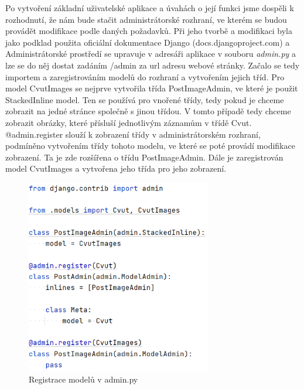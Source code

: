 Po vytvoření základní uživatelské aplikace a úvahách o její funkci jsme dospěli k rozhodnutí, že nám bude stačit administrátorské rozhraní, ve kterém se budou provádět modifikace podle daných požadavků.
Při jeho tvorbě a modifikaci byla jako podklad použita oficiální dokumentace Django (docs.djangoproject.com) a \cite{django-admin-book} Administrátorské prostředí se upravuje v adresáři aplikace v souboru \emph{admin.py} a lze se do něj dostat zadáním /admin za url adresu webové stránky. Začalo se tedy importem a zaregistrováním modelů do rozhraní a vytvořením jejich tříd. Pro model CvutImages se nejprve vytvořila třída PostImageAdmin, ve které je použit StackedInline model. Ten se používá pro vnořené třídy, tedy pokud je chceme zobrazit na jedné stránce společně s jinou třídou. V tomto případě tedy chceme zobrazit obrázky, které přísluší jednotlivým záznamům v třídě Cvut. @admin.register slouží k zobrazení třídy v administrátorském rozhraní, podmíněno vytvořením třídy tohoto modelu, ve které se poté provádí modifikace zobrazení. Ta je zde rozšířena o třídu PostImageAdmin. Dále je zaregistrován model CvutImages a vytvořena jeho třída pro jeho zobrazení.

\begin{figure}[H] \centering
    \includegraphics[width=230pt]{./pictures/12-admin-reg.PNG}
    \caption[Registrace modelů v admin.py]{Registrace modelů v admin.py}
	\label{fig:Registrace modelů v admin.py}              
\end{figure}

\newpage

